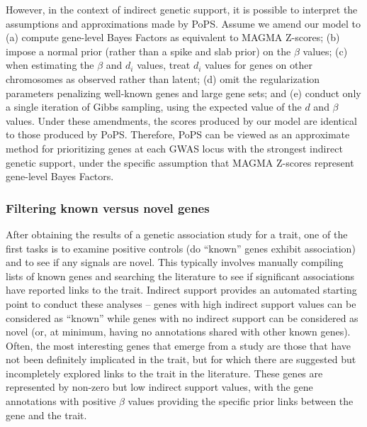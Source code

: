 \documentclass[11pt]{article}
\begin{document}
However, in the context of indirect genetic support, it is possible to
interpret the assumptions and approximations made by PoPS. Assume we amend
our model to (a) compute gene-level Bayes Factors as equivalent to
MAGMA Z-scores; (b) impose a normal prior (rather than a spike and
slab prior) on the $\beta$ values; (c) when estimating the $\beta$
and $d_i$ values, treat $d_i$ values for genes on other chromosomes as
observed rather than latent; (d) omit the regularization parameters
penalizing well-known genes and large gene sets; and (e) conduct only a single iteration
of Gibbs sampling, using the expected value of the $d$ and $\beta$
values. Under these amendments, the scores produced by our model are
identical to those produced by PoPS. Therefore, PoPS can be
viewed as an approximate method for prioritizing genes at each GWAS locus with the strongest indirect
genetic support, under the specific assumption that MAGMA Z-scores
represent gene-level Bayes Factors.

\subsubsection{Filtering known versus novel genes}
After obtaining the results of a genetic association study for a trait, one of the
first tasks is to examine positive controls (do ``known'' genes
exhibit association) and to see if any signals are novel. This
typically involves manually compiling lists of known genes and
searching the literature to see if significant associations have
reported links to the trait. Indirect support provides an
automated starting point to conduct these analyses -- genes with high
indirect support values can be considered as ``known'' while genes
with no indirect support can be considered as novel (or, at minimum,
having no annotations shared with other known genes). Often, the most
interesting genes that emerge from a study are those that have not
been definitely implicated in the trait, but for which there are
suggested but incompletely explored links to the trait in the
literature. These genes are represented by non-zero but low indirect
support values, with the gene annotations with positive $\beta$ values
providing the specific prior links between the gene and the trait.
\end{document}
